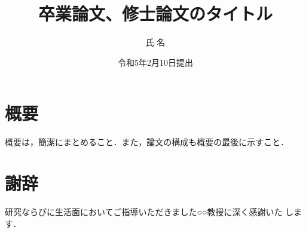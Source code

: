 \documentclass[12pt,dvipdfmx]{jreport}
\begin{document}

\title{卒業論文、修士論文のタイトル}


\author{氏 名}


\date{令和5年2月10日提出}




\maketitle


\setcounter{page}{1}
\chapter*{概要}

 概要は，簡潔にまとめること．また，論文の構成も概要の最後に示すこと．



\chapter*{謝辞}


研究ならびに生活面においてご指導いただきました○○教授に深く感謝いた
します．
\end{document}
